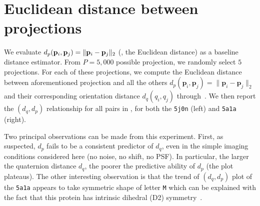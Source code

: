 \section{Euclidean distance between projections}\label{apx:results:distance-estimation}



We evaluate $d_p(\mathbf{p}_i, \mathbf{p}_j) = \Vert \mathbf{p}_i - \mathbf{p}_j \Vert_2$ (\ie, the Euclidean distance) as a baseline distance estimator.
From $P = 5,000$ possible projection, we randomly select $5$ projections.
For each of these projections, we compute the Euclidean distance between aforementioned projection and all the others $d_p(\mathbf{p}_i,\mathbf{p}_j)=\lVert\mathbf{p}_i-\mathbf{p}_j\rVert_2$ and their corresponding orientation distance $d_q(q_i,q_j)$ through~.
We then report the $(d_q,d_p)$ relationship for all pairs in , for both the \texttt{5j0n} (left) and \texttt{5a1a} (right).

Two principal observations can be made from this experiment.
First, as suspected, $d_p$ fails to be a consistent predictor of $d_q$, even in the simple imaging conditions considered here (no noise, no shift, no PSF).
In particular, the larger the quaternion distance $d_q$, the poorer the predictive ability of $d_p$ (the plot plateaus).
The other interesting observation is that the trend of $(d_q,d_p)$ plot of the \texttt{5a1a} appears to take symmetric shape of letter \texttt{M} which can be explained with the fact that this protein has intrinsic dihedral (D2) symmetry~\cite{noauthor_d2sym_nodate,noauthor_5a1asym_nodate}.

